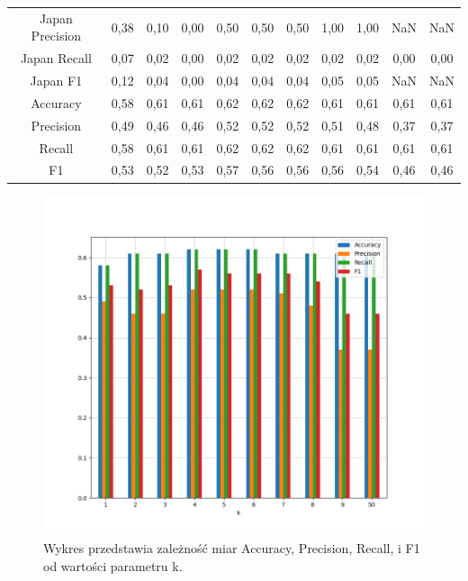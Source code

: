 \documentclass{classrep}
\begin{document}
\begin{table}[h!]
\begin{tabular}{c c c c c c c c c c c}
\hline
Japan Precision 		& 0,38 & 0,10 & 0,00 & 0,50 & 0,50  & 0,50 & 1,00 & 1,00 & NaN & NaN \\
Japan Recall 			& 0,07 & 0,02 & 0,00 & 0,02 & 0,02 & 0,02 & 0,02 & 0,02 & 0,00 & 0,00 \\
Japan F1 				& 0,12 & 0,04 & 0,00 & 0,04 & 0,04  & 0,04 & 0,05 & 0,05 & NaN & NaN\\
\hline
Accuracy 				& 0,58 & 0,61 & 0,61 & 0,62 & 0,62 & 0,62 & 0,61 & 0,61 & 0,61 & 0,61 \\
Precision 				& 0,49 & 0,46 & 0,46 & 0,52 & 0,52  & 0,52 & 0,51 &  0,48  & 0,37 & 0,37\\
Recall 				& 0,58 & 0,61 & 0,61 & 0,62 & 0,62 & 0,62 & 0,61 & 0,61 & 0,61 & 0,61  \\
F1 					& 0,53 & 0,52 & 0,53 & 0,57 & 0,56 & 0,56 & 0,56 & 0,54 & 0,46 & 0,46\\

\end {tabular}
\label {t1}
\end{table}

\newpage

\begin{figure}[h!]
 \centering
 \includegraphics[width=15cm]{wykres_k.png}
 \vspace{-0.3cm}
 \caption{Wykres przedstawia zależność miar Accuracy, Precision, Recall, i F1 od wartości parametru k.}
 \label{wykres1}
\end{figure}
\end{document}
